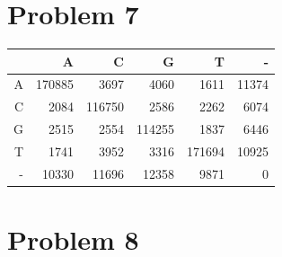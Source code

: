 \documentclass[11pt]{article}
\begin{document}
\section*{Problem 7}
\begin{tabular}{r||r|r|r|r|r}
  & A & C & G & T & -\\ \hline
\hline
A & 170885 & 3697 & 4060 & 1611 & 11374\\ 
\hline
C & 2084 & 116750 & 2586 & 2262 & 6074\\ 
\hline
G & 2515 & 2554 & 114255 & 1837 & 6446\\ 
\hline
T & 1741 & 3952 & 3316 & 171694 & 10925\\ 
\hline
- & 10330 & 11696 & 12358 & 9871 & 0\\ 
\end{tabular}
\section*{Problem 8}
\end{document}

